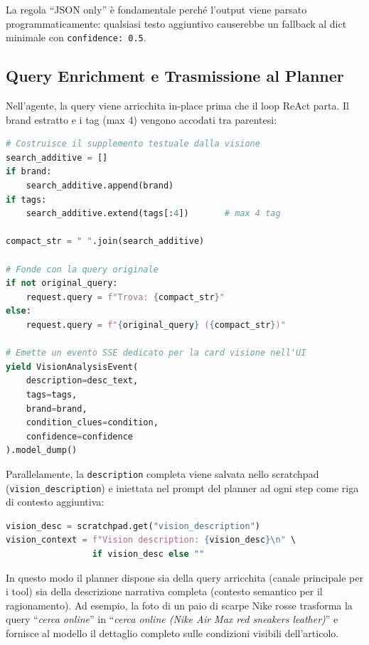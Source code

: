 La regola ``JSON only'' è fondamentale perché l'output viene parsato
programmaticamente: qualsiasi testo aggiuntivo causerebbe un fallback
al dict minimale con \texttt{confidence: 0.5}.

\subsection{Query Enrichment e Trasmissione al Planner}
\label{subsec:vision-integration}

Nell'agente, la query viene arricchita in-place prima che il loop
ReAct parta. Il brand estratto e i tag (max 4) vengono accodati
tra parentesi:

\begin{lstlisting}[language=Python,caption={Enrichment della query e VisionAnalysisEvent (app/agent/ebay\_agent.py)},label=lst:vision-enrichment]
# Costruisce il supplemento testuale dalla visione
search_additive = []
if brand:
    search_additive.append(brand)
if tags:
    search_additive.extend(tags[:4])       # max 4 tag

compact_str = " ".join(search_additive)

# Fonde con la query originale
if not original_query:
    request.query = f"Trova: {compact_str}"
else:
    request.query = f"{original_query} ({compact_str})"

# Emette un evento SSE dedicato per la card visione nell'UI
yield VisionAnalysisEvent(
    description=desc_text,
    tags=tags,
    brand=brand,
    condition_clues=condition,
    confidence=confidence
).model_dump()
\end{lstlisting}

Parallelamente, la \texttt{description} completa viene salvata nello
scratchpad (\texttt{vision\_description}) e iniettata nel prompt del
planner ad ogni step come riga di contesto aggiuntiva:

\begin{lstlisting}[language=Python,caption={Iniezione nel prompt del planner (app/agent/prompts.py)},label=lst:vision-injection]
vision_desc = scratchpad.get("vision_description")
vision_context = f"Vision description: {vision_desc}\n" \
                 if vision_desc else ""
\end{lstlisting}

In questo modo il planner dispone sia della query arricchita (canale
principale per i tool) sia della descrizione narrativa completa
(contesto semantico per il ragionamento). Ad esempio, la foto di un
paio di scarpe Nike rosse trasforma la query ``\emph{cerca online}''
in ``\emph{cerca online (Nike Air Max red sneakers leather)}'' e
fornisce al modello il dettaglio completo sulle condizioni visibili
dell'articolo.



